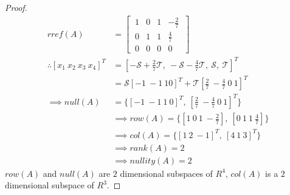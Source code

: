 \documentclass[../main.tex]{subfiles}
\begin{document}
\begin{proof}
        \begin{align*}
                rref(A)                              & =
                \begin{bmatrix}
                        \ 1 & 0 & 1 & -\frac{2}{7} \ \\
                        \ 0 & 1 & 1 & \frac{4}{7} \  \\
                        \ 0 & 0 & 0 & 0 \
                \end{bmatrix}                                                                                                                              \\
                \therefore [x_1 \ x_2 \ x_3 \ x_4]^T & = [-\mathcal{S}+\frac{2}{7}\mathcal{T}, \ -\mathcal{S} -\frac{4}{7}\mathcal{T}, \ \mathcal{S}, \ \mathcal{T}]^T \\
                                                     & = \mathcal{S}[-1 \ -1 \ 1 0]^T + \mathcal{T}[\frac{2}{7}\ -\frac{4}{7}\ 0\ 1]^T                                 \\
                \implies null(A)                     & = \{[-1 \ -1 \ 1\ 0]^T,\  [\frac{2}{7} \ -\frac{4}{7} \ 0 \ 1]^T\}                                              \\
                                                     & \implies row(A) = \{[1 \ 0 \ 1 \ -\frac{2}{7}],\ [0 \ 1 \ 1 \ \frac{4}{7}]\}                                    \\
                                                     & \implies col(A) = \{[1 \ 2 \ -1]^T,\ [4 \ 1 \ 3]^T\}                                                            \\
                                                     & \implies rank(A) = 2                                                                                            \\
                                                     & \implies nullity(A) = 2
        \end{align*}
        $row(A)$ and $null(A)$ are $2$ dimensional subspaces of $R^4$, $col(A)$ is a $2$ dimensional subspace of $R^3$.
\end{proof}
\pagebreak
\end{document}
